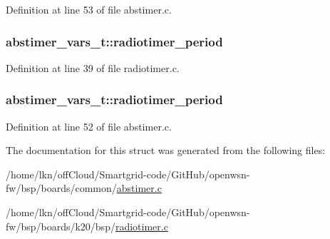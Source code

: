 Definition at line 53 of file abstimer.\+c.

\subsubsection[{\texorpdfstring{radiotimer\+\_\+period}{radiotimer_period}}]{ abstimer\+\_\+vars\+\_\+t\+::radiotimer\+\_\+period}\hypertarget{structabstimer__vars__t_aa30a1e953941c83d96cee6e06dc49748}{}\label{structabstimer__vars__t_aa30a1e953941c83d96cee6e06dc49748}


Definition at line 39 of file radiotimer.\+c.

\subsubsection[{\texorpdfstring{radiotimer\+\_\+period}{radiotimer_period}}]{ abstimer\+\_\+vars\+\_\+t\+::radiotimer\+\_\+period}\hypertarget{structabstimer__vars__t_a7292e4e9c40ca0f867d86f84c7be1144}{}\label{structabstimer__vars__t_a7292e4e9c40ca0f867d86f84c7be1144}


Definition at line 52 of file abstimer.\+c.



The documentation for this struct was generated from the following files\+:\begin{DoxyCompactItemize}
\item 
/home/lkn/off\+Cloud/\+Smartgrid-\/code/\+Git\+Hub/openwsn-\/fw/bsp/boards/common/\hyperlink{abstimer_8c}{abstimer.\+c}\item 
/home/lkn/off\+Cloud/\+Smartgrid-\/code/\+Git\+Hub/openwsn-\/fw/bsp/boards/k20/bsp/\hyperlink{k20_2bsp_2radiotimer_8c}{radiotimer.\+c}\end{DoxyCompactItemize}
